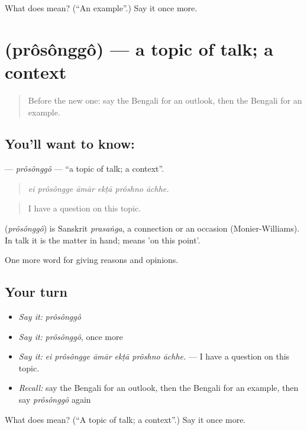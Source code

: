 \begin{tcolorbox}[breakable,colback=teal!4,colframe=teal!35!black,title={Before you move on}]
What does  mean? (\textquotedblleft{}An example\textquotedblright{}.) Say it once more.
\end{tcolorbox}
\section[\texorpdfstring{\bn{প্রসঙ্গ} (prôsônggô)}{প্রসঙ্গ (prôsônggô)}]{ (prôsônggô) — a topic of talk; a context}

\label{lesson:BN-C335-prosonggo}



\begin{quote}
Before the new one: say the Bengali for an outlook, then the Bengali for an example.
\end{quote}

\subsection*{You'll want to know: }
\textbf{} — \emph{prôsônggô} — \textquotedblleft{}a topic of talk; a context\textquotedblright{}.

\begin{quote}
     
\end{quote}

\begin{quote}
\emph{ei prôsôngge āmār ekṭā prôshno āchhe.}
\end{quote}

\begin{quote}
I have a question on this topic.
\end{quote}

\begin{cousinweb}
\textbf{} (\emph{prôsônggô}) is Sanskrit \emph{prasaṅga}, a connection or an occasion (Monier-Williams). In talk it is the matter in hand;   means 'on this point'.
\end{cousinweb}

\begin{grammarlens}[title={What you've built}]
One more word for giving reasons and opinions.
\end{grammarlens}

\subsection*{Your turn}
\begin{itemize}
\raggedright
  \item \emph{Say it:} \emph{prôsônggô}
  \item \emph{Say it:} \emph{prôsônggô}, once more
  \item \emph{Say it:} \emph{ei prôsôngge āmār ekṭā prôshno āchhe.} — I have a question on this topic.
  \item \emph{Recall:} say the Bengali for an outlook, then the Bengali for an example, then say \emph{prôsônggô} again
\end{itemize}

\begin{tcolorbox}[breakable,colback=teal!4,colframe=teal!35!black,title={Before you move on}]
What does  mean? (\textquotedblleft{}A topic of talk; a context\textquotedblright{}.) Say it once more.
\end{tcolorbox}
